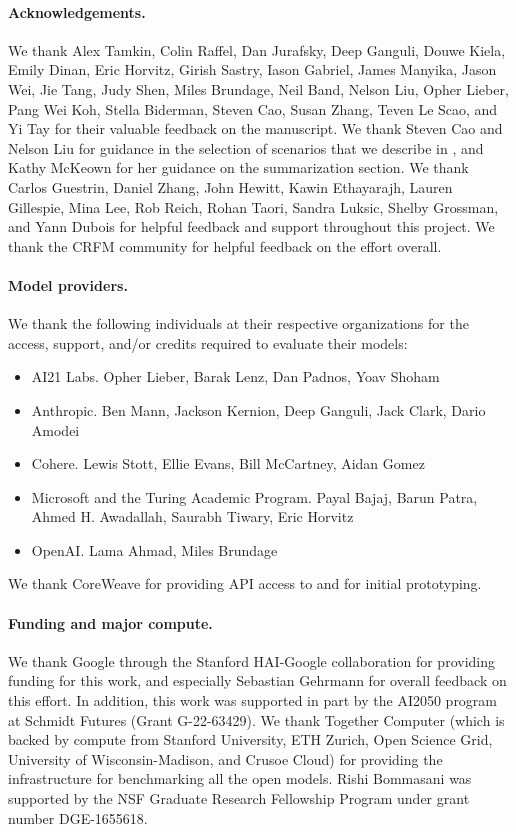 \paragraph{Acknowledgements.}
We thank 
Alex Tamkin,
Colin Raffel,
Dan Jurafsky,
Deep Ganguli,
Douwe Kiela,
Emily Dinan,
Eric Horvitz,
Girish Sastry,
Iason Gabriel,
James Manyika,
Jason Wei,
Jie Tang,
Judy Shen,
Miles Brundage,
Neil Band,
Nelson Liu,
Opher Lieber,
Pang Wei Koh,
Stella Biderman,
Steven Cao,
Susan Zhang,
Teven Le Scao,
and
Yi Tay
for their valuable feedback on the manuscript.
We thank Steven Cao and Nelson Liu for guidance in the selection of \core scenarios that we describe in , and Kathy McKeown for her guidance on the summarization section.
We thank
Carlos Guestrin,
Daniel Zhang,
John Hewitt,
Kawin Ethayarajh,
Lauren Gillespie,
Mina Lee,
Rob Reich,
Rohan Taori,
Sandra Luksic,
Shelby Grossman, 
and
Yann Dubois
for helpful feedback and support throughout this project. 
We thank the CRFM community for helpful feedback on the effort overall. 

\paragraph{Model providers.}
We thank the following individuals at their respective organizations for the access, support, and/or credits required to evaluate their models:
\begin{itemize}
    \item AI21 Labs. Opher Lieber, Barak Lenz, Dan Padnos, Yoav Shoham
    \item Anthropic. Ben Mann, Jackson Kernion, Deep Ganguli, Jack Clark, Dario Amodei
    \item Cohere. Lewis Stott, Ellie Evans, Bill McCartney, Aidan Gomez
    \item Microsoft and the Turing Academic Program. Payal Bajaj, Barun Patra, Ahmed H. Awadallah, Saurabh Tiwary, Eric Horvitz
    \item OpenAI. Lama Ahmad, Miles Brundage
\end{itemize}
We thank CoreWeave for providing API access to \gptj and \gptneox for initial prototyping.

\paragraph{Funding and major compute.}
We thank Google through the Stanford HAI-Google collaboration for providing funding for this work, and especially Sebastian Gehrmann for overall feedback on this effort.
In addition, this work was supported in part by the AI2050 program at Schmidt Futures (Grant G-22-63429).
We thank Together Computer (which is backed by compute from Stanford University, ETH Zurich, Open Science Grid, University of Wisconsin-Madison, and Crusoe Cloud) for providing the infrastructure for benchmarking all the open models.
Rishi Bommasani was supported by the NSF Graduate Research Fellowship Program under grant number DGE-1655618.

